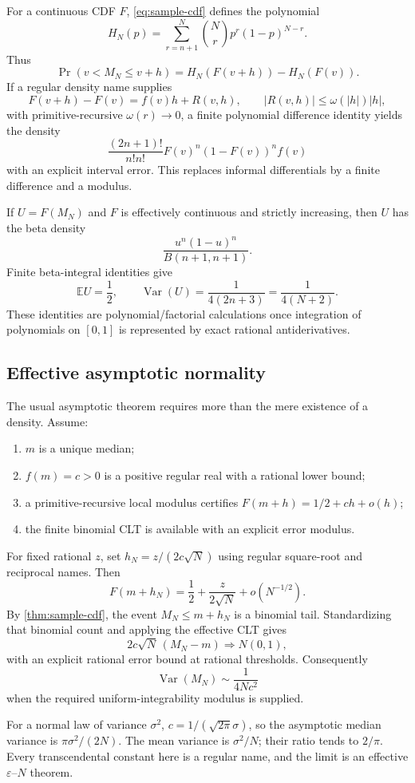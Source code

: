 \documentclass[11pt]{article}
\newcommand{\abs}[1]{\left|#1\right|}
\begin{document}
For a continuous CDF $F$, \cref{eq:sample-cdf} defines the polynomial
\[
 H_N(p)=\sum_{r=n+1}^{N}\binom Nr p^r(1-p)^{N-r}.
\]
Thus
\[
 \Pr(v<M_N\leq v+h)=H_N(F(v+h))-H_N(F(v)).
\]
If a regular density name supplies
\[
 F(v+h)-F(v)=f(v)h+R(v,h),
 \qquad \abs{R(v,h)}\leq\omega(\abs h)\abs h,
\]
with primitive-recursive $\omega(r)\to0$, a finite polynomial difference
identity yields the density
\[
 \frac{(2n+1)!}{n!n!}F(v)^n(1-F(v))^nf(v)
\]
with an explicit interval error.  This replaces informal differentials by a
finite difference and a modulus.

If $U=F(M_N)$ and $F$ is effectively continuous and strictly increasing, then
$U$ has the beta density
\[
 \frac{u^n(1-u)^n}{B(n+1,n+1)}.
\]
Finite beta-integral identities give
\[
 \mathbb E U=\frac12,
 \qquad \operatorname{Var}(U)=\frac1{4(2n+3)}
 =\frac1{4(N+2)}.
\]
These identities are polynomial/factorial calculations once integration of
polynomials on $[0,1]$ is represented by exact rational antiderivatives.

\subsection{Effective asymptotic normality}

The usual asymptotic theorem requires more than the mere existence of a
density.  Assume:

\begin{enumerate}
\item $m$ is a unique median;
\item $f(m)=c>0$ is a positive regular real with a rational lower bound;
\item a primitive-recursive local modulus certifies
$F(m+h)=1/2+ch+o(h)$;
\item the finite binomial CLT is available with an explicit error modulus.
\end{enumerate}

For fixed rational $z$, set $h_N=z/(2c\sqrt N)$ using regular square-root and
reciprocal names.  Then
\[
 F(m+h_N)=\frac12+\frac{z}{2\sqrt N}+o(N^{-1/2}).
\]
By \cref{thm:sample-cdf}, the event $M_N\leq m+h_N$ is a binomial tail.
Standardizing that binomial count and applying the effective CLT gives
\[
 2c\sqrt N\,(M_N-m)\Longrightarrow N(0,1),
\]
with an explicit rational error bound at rational thresholds.  Consequently
\[
 \operatorname{Var}(M_N)\sim\frac1{4Nc^2}
\]
when the required uniform-integrability modulus is supplied.

For a normal law of variance $\sigma^2$,
$c=1/(\sqrt{2\pi}\sigma)$, so the asymptotic median variance is
$\pi\sigma^2/(2N)$.  The mean variance is $\sigma^2/N$; their ratio tends to
$2/\pi$.  Every transcendental constant here is a regular name, and the limit
is an effective $\varepsilon$--$N$ theorem.
\end{document}
